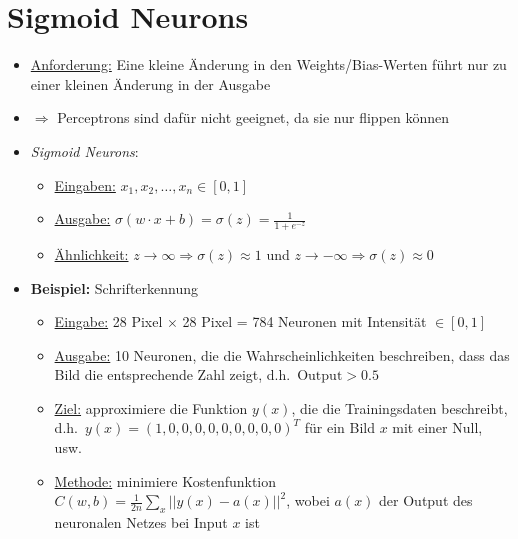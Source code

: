 \section{Sigmoid Neurons}

\begin{itemize}
  \item \underline{Anforderung:} Eine kleine Änderung in den Weights/Bias-Werten führt nur zu einer kleinen Änderung in der Ausgabe
  \item $\Rightarrow$ Perceptrons sind dafür nicht geeignet, da sie nur flippen können
  \item \emph{Sigmoid Neurons}:
  \begin{itemize}
    \item \underline{Eingaben:} $x_1, x_2, \ldots, x_n \in [0, 1]$
    \item \underline{Ausgabe:} $\sigma(w \cdot x + b) = \sigma(z) = \frac{1}{1+e^{-z}}$
    \item \underline{Ähnlichkeit:} $z \rightarrow \infty \Rightarrow \sigma(z) \approx 1$ und $z \rightarrow - \infty \Rightarrow \sigma(z) \approx 0$
  \end{itemize}
\end{itemize}

\begin{center}
\end{center}

\begin{itemize}
  \item \textbf{Beispiel:} Schrifterkennung
  \begin{itemize}
    \item \underline{Eingabe:} 28 Pixel $\times$ 28 Pixel = 784 Neuronen mit Intensität $\in [0,1]$
    \item \underline{Ausgabe:} 10 Neuronen, die die Wahrscheinlichkeiten beschreiben, dass das Bild die entsprechende Zahl zeigt, d.h.\ $\text{Output} > 0.5$
    \item \underline{Ziel:} approximiere die Funktion $y(x)$, die die Trainingsdaten beschreibt, d.h.\ $y(x) = {(1, 0, 0, 0, 0, 0, 0, 0, 0, 0)}^T$ für ein Bild $x$ mit einer Null, usw.
    \item \underline{Methode:} minimiere Kostenfunktion $C(w,b) = \frac{1}{2n} \sum_x || y(x) - a(x) ||^2$, wobei $a(x)$ der Output des neuronalen Netzes bei Input $x$ ist
  \end{itemize}
\end{itemize}

